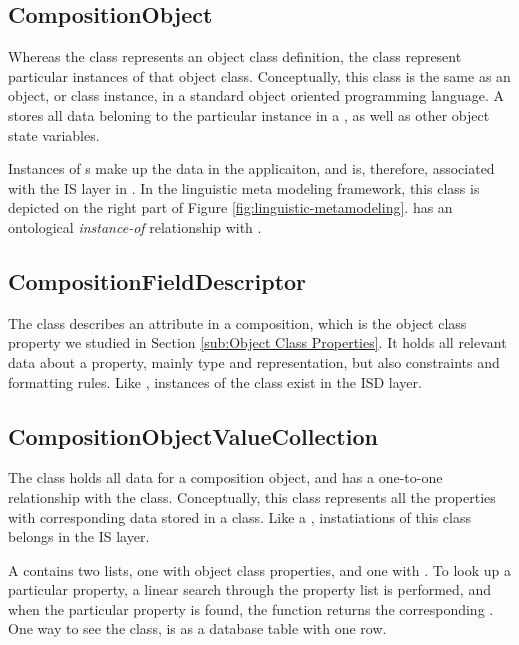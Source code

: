 \subsection{CompositionObject}
\label{sub:CompositionObject}
Whereas the  class represents an object class definition, the  class represent particular instances of that object class. Conceptually, this class is the same as an object, or class instance, in a standard object oriented programming language. A  stores all data beloning to the particular instance in a , as well as other object state variables.

Instances of s make up the data in the applicaiton, and is, therefore, associated with the IS layer in \mde. In the linguistic meta modeling framework, this class is depicted on the right part of Figure \ref{fig:linguistic-metamodeling}.  has an ontological \textit{instance-of} relationship with .

\subsection{CompositionFieldDescriptor}
\label{sub:CompositionFieldDescriptor}
The  class describes an attribute in a composition, which is the object class property we studied in Section \ref{sub:Object Class Properties}. It holds all relevant data about a property, mainly type and representation, but also constraints and formatting rules. Like , instances of the  class exist in the ISD layer.

\subsection{CompositionObjectValueCollection}
\label{sub:CompositionObjectValueCollection}
The  class holds all data for a composition object, and has a one-to-one relationship with the  class. Conceptually, this class represents all the properties with corresponding data stored in a class. Like a , instatiations of this class belongs in the IS layer.

A  contains two lists, one with object class properties, and one with . To look up a particular property, a linear search through the property list is performed, and when the particular property is found, the function returns the corresponding . One way to see the  class, is as a database table with one row.


